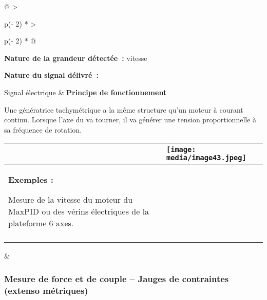\documentclass[
]{article}
\begin{document}
\begin{longtable}[]{@{}
  >{\raggedright\arraybackslash}p{(\columnwidth - 2\tabcolsep) * }
  >{\raggedright\arraybackslash}p{(\columnwidth - 2\tabcolsep) * }@{}}
\toprule
\textbf{Nature de la grandeur détectée~:} vitesse

\textbf{Nature du signal délivré~:}

Signal électrique & \textbf{Principe de fonctionnement}

Une génératrice tachymétrique a la même structure qu'un moteur à courant
continu. Lorsque l'axe du va tourner, il va générer une tension
proportionnelle à sa fréquence de rotation. \\
\midrule
\endhead
\begin{minipage}[t]{\linewidth}\raggedright
\begin{longtable}[]{@{}
  >{\raggedright\arraybackslash}p{}
  >{\raggedright\arraybackslash}p{}@{}}
\toprule
&
\texttt{[image: media/image43.jpeg]} \\
\midrule
\endhead
\textbf{Exemples :}

Mesure de la vitesse du moteur du MaxPID ou des vérins électriques de la
plateforme 6 axes. & \\
& \\
\bottomrule
\end{longtable}
\end{minipage} & \\
\bottomrule
\end{longtable}

\hypertarget{mesure-de-force-et-de-couple-jauges-de-contraintes-extenso-muxe9triques}{%
\subsubsection{Mesure de force et de couple -- Jauges de contraintes
(extenso
métriques)}\label{mesure-de-force-et-de-couple-jauges-de-contraintes-extenso-muxe9triques}}
\end{document}
